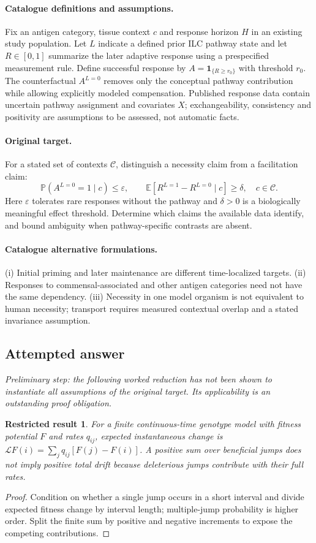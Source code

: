 \documentclass[11pt]{article}
\newcommand{\E}{\mathbb E}
\newcommand{\Prob}{\mathbb P}
\providecommand{\E}{\mathbb E}
\providecommand{\Prob}{\mathbb P}
\newtheorem{attemptresult}{Restricted result}[section]
\begin{document}
\paragraph{Catalogue definitions and assumptions.}
Fix an antigen category, tissue context $c$ and response horizon $H$ in an existing study population. Let $L$ indicate a defined prior ILC pathway state and let $R\in[0,1]$ summarize the later adaptive response using a prespecified measurement rule. Define successful response by $A=\mathbf1_{\{R\geq r_0\}}$ with threshold $r_0$. The counterfactual $A^{L=0}$ removes only the conceptual pathway contribution while allowing explicitly modeled compensation. Published response data contain uncertain pathway assignment and covariates $X$; exchangeability, consistency and positivity are assumptions to be assessed, not automatic facts.
\paragraph{Original target.}
For a stated set of contexts $\mathcal C$, distinguish a necessity claim from a facilitation claim:
    \[\Prob(A^{L=0}=1\mid c)\leq\varepsilon,
    \qquad \E[R^{L=1}-R^{L=0}\mid c]\geq\delta,\quad c\in\mathcal C.\]
    Here $\varepsilon$ tolerates rare responses without the pathway and $\delta>0$ is a biologically meaningful effect threshold. Determine which claims the available data identify, and bound ambiguity when pathway-specific contrasts are absent.
\paragraph{Catalogue alternative formulations.}
(i) Initial priming and later maintenance are different time-localized targets. (ii) Responses to commensal-associated and other antigen categories need not have the same dependency. (iii) Necessity in one model organism is not equivalent to human necessity; transport requires measured contextual overlap and a stated invariance assumption.
\subsection{Attempted answer}
\noindent\emph{Preliminary step: the following worked reduction has not been shown to instantiate all assumptions of the original target. Its applicability is an outstanding proof obligation.}

\begin{attemptresult}
For a finite continuous-time genotype model with fitness potential $F$ and rates $q_{ij}$, expected instantaneous change is $\mathcal LF(i)=\sum_jq_{ij}[F(j)-F(i)]$. A positive sum over beneficial jumps does not imply positive total drift because deleterious jumps contribute with their full rates.
\end{attemptresult}
\begin{proof}
Condition on whether a single jump occurs in a short interval and divide expected fitness change by interval length; multiple-jump probability is higher order. Split the finite sum by positive and negative increments to expose the competing contributions.
\end{proof}
\end{document}
